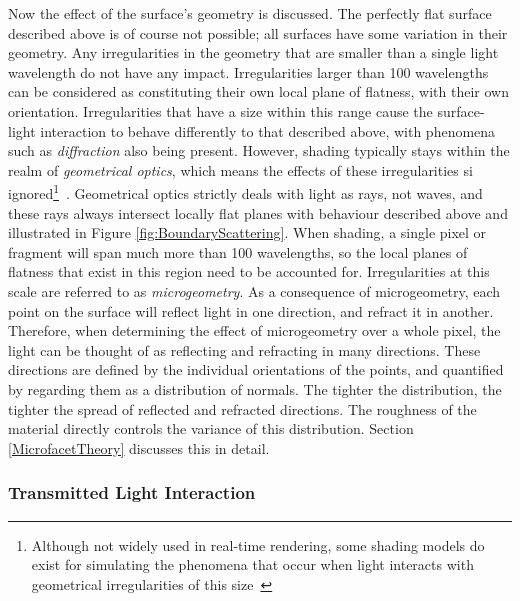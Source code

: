 Now the effect of the surface's geometry is discussed. The perfectly flat surface described above is of course not possible; all surfaces have some variation in their geometry. Any irregularities in the geometry that are smaller than a single light wavelength do not have any impact. Irregularities larger than 100 wavelengths can be considered as constituting their own local plane of flatness, with their own orientation. Irregularities that have a size within this range cause the surface-light interaction to behave differently to that described above, with phenomena such as \textit{diffraction} also being present. However, shading typically stays within the realm of \textit{geometrical optics}, which means the effects of these irregularities si ignored\footnote{Although not widely used in real-time rendering, some shading models do exist for simulating the phenomena that occur when light interacts with geometrical irregularities of this size~\cite{ReflectionAndDiffractionModel}}~\cite{DiffuseSpecularAtSurfaces}. Geometrical optics strictly deals with light as rays, not waves, and these rays always intersect locally flat planes with behaviour described above and illustrated in Figure \ref{fig:BoundaryScattering}. When shading, a single pixel or fragment will span much more than 100 wavelengths, so the local planes of flatness that exist in this region need to be accounted for. Irregularities at this scale are referred to as \textit{microgeometry}. As a consequence of microgeometry, each point on the surface will reflect light in one direction, and refract it in another. Therefore, when determining the effect of microgeometry over a whole pixel, the light can be thought of as reflecting and refracting in many directions. These directions are defined by the individual orientations of the points, and quantified by regarding them as a distribution of normals. The tighter the distribution, the tighter the spread of reflected and refracted directions. The roughness of the material directly controls the variance of this distribution. Section \ref{MicrofacetTheory} discusses this in detail.

\subsubsection{Transmitted Light Interaction}

